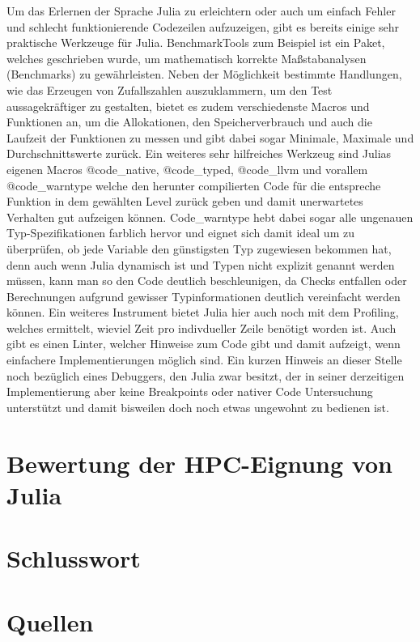 \documentclass[proseminar,german,utf8]{zihpub}
\begin{document}
Um das Erlernen der Sprache Julia zu erleichtern oder auch um einfach Fehler und schlecht funktionierende Codezeilen aufzuzeigen, gibt es bereits einige sehr praktische Werkzeuge für Julia. BenchmarkTools zum Beispiel ist ein Paket, welches geschrieben wurde, um mathematisch korrekte Maßstabanalysen (Benchmarks) zu gewährleisten. Neben der Möglichkeit bestimmte Handlungen, wie das Erzeugen von Zufallszahlen auszuklammern, um den Test aussagekräftiger zu gestalten, bietet es zudem verschiedenste Macros und Funktionen an, um die Allokationen, den Speicherverbrauch und auch die Laufzeit der Funktionen zu messen und gibt dabei sogar Minimale, Maximale und Durchschnittswerte zurück. Ein weiteres sehr hilfreiches Werkzeug sind Julias eigenen Macros @code\_native, @code\_typed, @code\_llvm und vorallem @code\_warntype welche den herunter compilierten Code für die entspreche Funktion in dem gewählten Level zurück geben und damit unerwartetes Verhalten gut aufzeigen können. Code\_warntype hebt dabei sogar alle ungenauen Typ-Spezifikationen farblich hervor und eignet sich damit ideal um zu überprüfen, ob jede Variable den günstigsten Typ zugewiesen bekommen hat, denn auch wenn Julia dynamisch ist und Typen nicht explizit genannt werden müssen, kann man so den Code deutlich beschleunigen, da Checks entfallen oder Berechnungen aufgrund gewisser Typinformationen deutlich vereinfacht werden können. Ein weiteres Instrument bietet Julia hier auch noch mit dem Profiling, welches ermittelt, wieviel Zeit pro indivdueller Zeile benötigt worden ist. Auch gibt es einen Linter, welcher Hinweise zum Code gibt und damit aufzeigt, wenn einfachere Implementierungen möglich sind. Ein kurzen Hinweis an dieser Stelle noch bezüglich eines Debuggers, den Julia zwar besitzt, der in seiner derzeitigen Implementierung aber keine Breakpoints oder nativer Code Untersuchung unterstützt und damit bisweilen doch noch etwas ungewohnt zu bedienen ist.

\section{Bewertung der HPC-Eignung von Julia}
\section{Schlusswort}
\section{Quellen}
\end{document}
